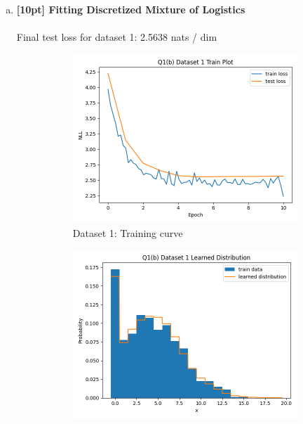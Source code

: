 \documentclass{article}
\begin{document}
\begin{enumerate}[(a)]
\newpage

\item {\bf [10pt] Fitting Discretized Mixture of Logistics} \\\\
Final test loss for dataset 1: 2.5638 nats / dim
\begin{figure}[H]
    \centering
    \begin{subfigure}{0.45\textwidth}
        \centering
        \includegraphics[width=\textwidth]{figures/q1_b_dset1_train_plot.png}
        \caption{Dataset 1: Training curve}
    \end{subfigure}
    \hspace{0.2in}
    \begin{subfigure}{0.45\textwidth}
        \centering
        \includegraphics[width=\textwidth]{figures/q1_b_dset1_learned_dist.png}

\end{subfigure}
\end{figure}
\end{enumerate}
\end{document}
